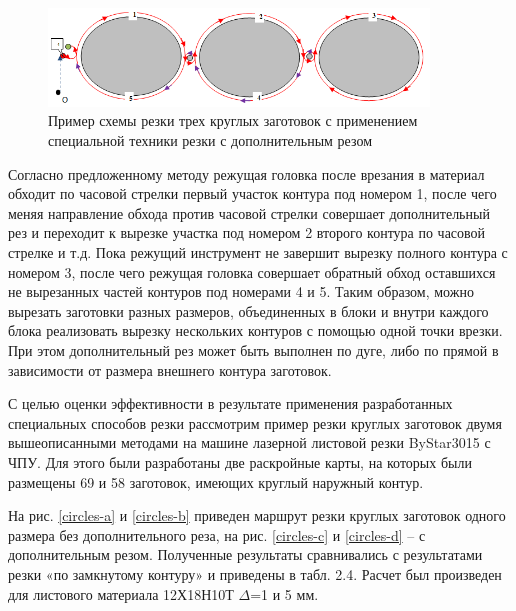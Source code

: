 \documentclass[12pt,twoside]{report}
\begin{document}
\begin{figure}
  \begin{center}
  \includegraphics[width=0.9\textwidth]{3-extra.png}
  \caption{Пример схемы резки трех круглых заготовок с применением специальной техники резки с дополнительным резом}
  \label{3-extra}
  \end{center}
\end{figure}

Согласно предложенному методу режущая головка
после врезания в материал обходит по часовой
стрелки первый участок контура под номером 1,
после чего меняя направление обхода против
часовой стрелки совершает дополнительный рез и
переходит к вырезке участка под номером 2 второго
контура по часовой стрелке и т.д.
Пока режущий инструмент не завершит
вырезку полного контура с номером 3,
после чего режущая головка совершает обратный обход
оставшихся не вырезанных частей контуров под номерами 4 и 5.
Таким образом, можно вырезать заготовки разных размеров,
объединенных в блоки и внутри каждого блока реализовать
вырезку нескольких контуров с помощью одной точки врезки.
При этом дополнительный рез может быть выполнен по дуге,
либо по прямой в зависимости от размера внешнего контура заготовок.

С целью оценки эффективности в результате применения
разработанных специальных способов резки рассмотрим
пример резки круглых заготовок двумя вышеописанными
методами на машине лазерной листовой резки ByStar3015 с ЧПУ.
Для этого были разработаны две раскройные карты,
на которых были размещены 69 и 58 заготовок,
имеющих круглый наружный контур.

На рис. \ref{circles-a} и \ref{circles-b}
приведен маршрут резки
круглых заготовок одного размера без дополнительного реза,
на рис. \ref{circles-c} и \ref{circles-d} – с дополнительным резом.
Полученные результаты сравнивались с результатами
резки «по замкнутому контуру» и приведены в табл. 2.4.
Расчет был произведен для листового материала 12Х18Н10Т $\Delta$=1 и 5 мм.
\end{document}
